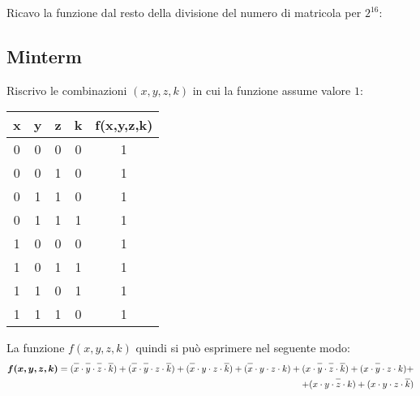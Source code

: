 \documentclass{article}
\newcommand*{\oline}[1]{\overline{#1\mathstrut}}
\begin{document}
Ricavo la funzione dal resto della divisione del numero di matricola per $2^{16}$:\\

\newpage

\subsection*{Minterm}
Riscrivo le combinazioni $(x,y,z,k)$ in cui la funzione assume valore $1$:\\
\begin{center}
  \begin{tabular}{|c|c|c|c|c|}
    \hline
    \textbf{x} & \textbf{y} & \textbf{z} & \textbf{k} & \textbf{f(x,y,z,k)} \\
    \hline
      0 & 0 & 0 & 0 & 1 \\
    \hline
      0 & 0 & 1 & 0 & 1 \\
    \hline
      0 & 1 & 1 & 0 & 1 \\
    \hline
      0 & 1 & 1 & 1 & 1 \\
    \hline
      1 & 0 & 0 & 0 & 1 \\
    \hline
      1 & 0 & 1 & 1 & 1 \\
    \hline
      1 & 1 & 0 & 1 & 1 \\
    \hline
      1 & 1 & 1 & 0 & 1 \\
    \hline
  \end{tabular}
\end{center}
La funzione $f(x,y,z,k)$ quindi si può esprimere nel seguente modo:
\begin{align*}
  \bm{f(x,y,z,k)} = (\oline{x} \cdot \oline{y} \cdot \oline{z} \cdot \oline{k}) + (\oline{x} \cdot \oline{y}\cdot z \cdot \oline{k})
      + (\oline{x} \cdot y \cdot z \cdot \oline{k}) + (\oline{x} \cdot y \cdot z \cdot k) + (x \cdot \oline{y} \cdot \oline{z} \cdot \oline{k})
        + (x \cdot \oline{y} \cdot z \cdot k) + \\ + (x \cdot y \cdot \oline{z} \cdot k) + (x \cdot y \cdot z \cdot \oline{k})
\end{align*}
\end{document}
